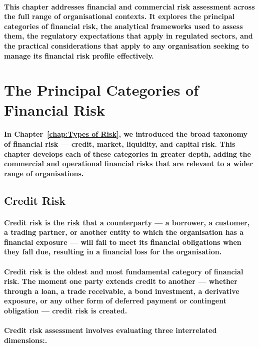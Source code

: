 \paragraph{This chapter addresses financial and commercial risk assessment across the full range of organisational contexts. It explores the principal categories of financial risk, the analytical frameworks used to assess them, the regulatory expectations that apply in regulated sectors, and the practical considerations that apply to any organisation seeking to manage its financial risk profile effectively.}

\section{The Principal Categories of Financial Risk}
\paragraph{In Chapter~\ref{chap:Types of Risk}, we introduced the broad taxonomy of financial risk — credit, market, liquidity, and capital risk. This chapter develops each of these categories in greater depth, adding the commercial and operational financial risks that are relevant to a wider range of organisations.}

\subsection{Credit Risk}
\paragraph{\textbf{Credit risk} is the risk that a counterparty — a borrower, a customer, a trading partner, or another entity to which the organisation has a financial exposure — will fail to meet its financial obligations when they fall due, resulting in a financial loss for the organisation.}
\paragraph{Credit risk is the oldest and most fundamental category of financial risk. The moment one party extends credit to another — whether through a loan, a trade receivable, a bond investment, a derivative exposure, or any other form of deferred payment or contingent obligation — credit risk is created.}
\paragraph{Credit risk assessment involves evaluating three interrelated dimensions:.}
